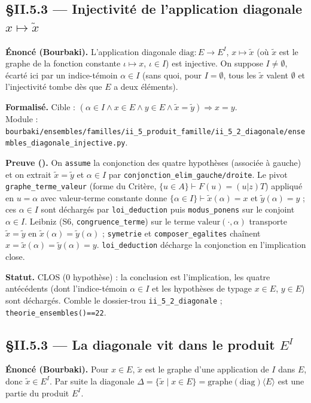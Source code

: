 \subsection{§II.5.3 --- Injectivité de l'application diagonale $x\mapsto\tilde{x}$}
\textbf{Énoncé (Bourbaki).} L'application diagonale $\mathrm{diag}:E\to E^I$, $x\mapsto\tilde{x}$ (où $\tilde{x}$ est le graphe de la fonction constante $\iota\mapsto x$, $\iota\in I$) est injective. On suppose $I\neq\emptyset$, écarté ici par un indice-témoin $\alpha\in I$ (sans quoi, pour $I=\emptyset$, tous les $\tilde{x}$ valent $\emptyset$ et l'injectivité tombe dès que $E$ a deux éléments).

\textbf{Formalisé.} Cible : $(\alpha\in I \wedge x\in E \wedge y\in E \wedge \tilde{x}=\tilde{y})\Rightarrow x=y$. \\
Module : \texttt{bourbaki/ensembles/familles/ii\_5\_produit\_famille/ii\_5\_2\_diagonale/ensembles\_diagonale\_injective.py}.

\textbf{Preuve (\Nstar).} On \texttt{assume} la conjonction des quatre hypothèses (associée à gauche) et on extrait $\tilde{x}=\tilde{y}$ et $\alpha\in I$ par \texttt{conjonction\_elim\_gauche/droite}. Le pivot \texttt{graphe\_terme\_valeur} (forme du Critère, $\{u\in A\}\vdash F(u)=(u|z)T$) appliqué en $u=\alpha$ avec valeur-terme constante donne $\{\alpha\in I\}\vdash\tilde{x}(\alpha)=x$ et $\tilde{y}(\alpha)=y$ ; ces $\alpha\in I$ sont déchargés par \texttt{loi\_deduction} puis \texttt{modus\_ponens} sur le conjoint $\alpha\in I$. Leibniz (S6, \texttt{congruence\_terme}) sur le terme $\mathrm{valeur}(\cdot,\alpha)$ transporte $\tilde{x}=\tilde{y}$ en $\tilde{x}(\alpha)=\tilde{y}(\alpha)$ ; \texttt{symetrie} et \texttt{composer\_egalites} chaînent $x=\tilde{x}(\alpha)=\tilde{y}(\alpha)=y$. \texttt{loi\_deduction} décharge la conjonction en l'implication close.

\textbf{Statut.} CLOS (0 hypothèse) : la conclusion est l'implication, les quatre antécédents (dont l'indice-témoin $\alpha\in I$ et les hypothèses de typage $x\in E$, $y\in E$) sont déchargés. Comble le dossier-trou \texttt{ii\_5\_2\_diagonale} ; \texttt{theorie\_ensembles()==22}.


\subsection{§II.5.3 --- La diagonale vit dans le produit $E^I$}
\textbf{Énoncé (Bourbaki).} Pour $x\in E$, $\tilde{x}$ est le graphe d'une application de $I$ dans $E$, donc $\tilde{x}\in E^I$. Par suite la diagonale $\Delta=\{\tilde{x}\mid x\in E\}=\mathrm{graphe}(\mathrm{diag})\langle E\rangle$ est une partie du produit $E^I$.

